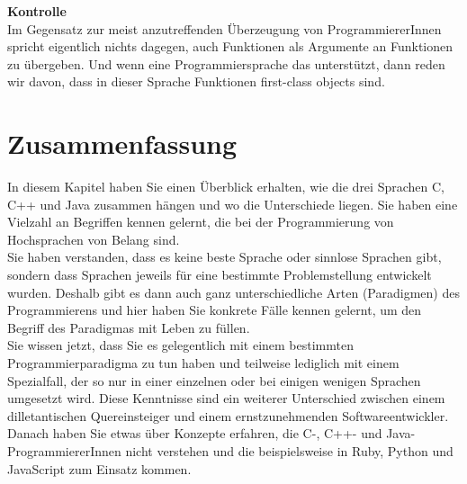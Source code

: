 \textbf{Kontrolle}\\
Im Gegensatz zur meist anzutreffenden Überzeugung von ProgrammiererInnen spricht eigentlich nichts dagegen, auch Funktionen als Argumente an Funktionen zu übergeben. Und wenn eine Programmiersprache das unterstützt, dann reden wir davon, dass in dieser Sprache Funktionen first-class objects sind.

\section{Zusammenfassung}
In diesem Kapitel haben Sie einen Überblick erhalten, wie die drei Sprachen C, C++ und Java zusammen hängen und wo die Unterschiede liegen. Sie haben eine Vielzahl an Begriffen kennen gelernt, die bei der Programmierung von Hochsprachen von Belang sind. \\

Sie haben verstanden, dass es keine beste Sprache oder sinnlose Sprachen gibt, sondern dass Sprachen jeweils für eine bestimmte Problemstellung entwickelt wurden. Deshalb gibt es dann auch ganz unterschiedliche Arten (Paradigmen) des Programmierens und hier haben Sie konkrete Fälle kennen gelernt, um den Begriff des Paradigmas mit Leben zu füllen.\\

Sie wissen jetzt, dass Sie es gelegentlich mit einem bestimmten Programmierparadigma zu tun haben und teilweise lediglich mit einem Spezialfall, der so nur in einer einzelnen oder bei einigen wenigen Sprachen umgesetzt wird. Diese Kenntnisse sind ein weiterer Unterschied zwischen einem dilletantischen Quereinsteiger und einem ernstzunehmenden Softwareentwickler.\\

Danach haben Sie etwas über Konzepte erfahren, die C-, C++- und Java-ProgrammiererInnen nicht verstehen und die beispielsweise in Ruby, Python und JavaScript zum Einsatz kommen.